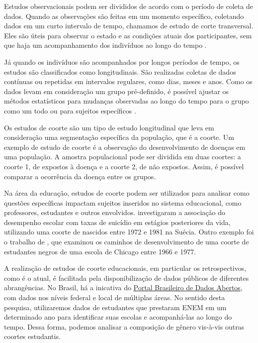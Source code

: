 Estudos observacionais podem ser divididos de acordo com o período de coleta de dados. Quando as observações são feitas em um momento específico, coletando dados em um curto intervalo de tempo, chamamos de estudo de corte transversal. Eles são úteis para observar o estado e as condições atuais dos participantes, sem que haja um acompanhamento dos indivíduos ao longo do tempo \autocite{Zangirolami-Raimundo2018}. 

Já quando os indivíduos são acompanhados por longos períodos de tempo, os estudos são classificados como longitudinais. São realizadas coletas de dados contínuas ou repetidas em intervalos regulares, como dias, meses e anos. Como os dados levam em consideração um grupo pré-definido, é possível ajustar os métodos estatísticos para mudanças observadas ao longo do tempo para o grupo como um todo ou para sujeitos específicos \autocite{Caruana2015}.

Os estudos de coorte são um tipo de estudo longitudinal que leva em consideração uma segmentação específica da população, que é a coorte. Um exemplo de estudo de coorte é a observação do desenvolvimento de doenças em uma população. A amostra populacional pode ser dividida em duas coortes: a coorte 1, de expostos à doença e a coorte 2, de não expostos. Assim, é possível comparar a ocorrência da doença entre os grupos.

Na área da educação, estudos de coorte podem ser utilizados para analisar como questões específicas impactam sujeitos inseridos no sistema educacional, como professores, estudantes e outros envolvidos. \citet{Bjorkenstam993} investigaram a associação do desempenho escolar com taxas de suicídio em estágios posteriores da vida, utilizando uma coorte de nascidos entre 1972 e 1981 na Suécia. Outro exemplo foi o trabalho de \citet{Ensminger1992}, que examinou os caminhos de desenvolvimento de uma coorte de estudantes negros de uma escola de Chicago entre 1966 e 1977. 

A realização de estudos de coorte educacionais, em particular os retrospectivos, como é o atual, é facilitada pela disponibilização de dados públicos de diferentes abrangências. No Brasil, há a inicativa do \href{https://dados.gov.br/home}{Portal Brasileiro de Dados Abertos}, com dados nos níveis federal e local de múltiplas áreas. No sentido desta pesquisa, utilizaremos dados de estudantes que prestaram ENEM em um determinado ano para identificar suas escolas e acompanhá-las ao longo do tempo. Dessa forma, podemos analisar a composição de gênero vis-à-vis outras coortes estudantis.


